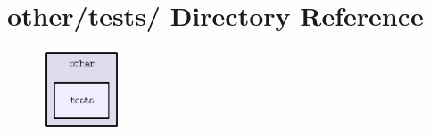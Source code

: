 \section{other/tests/ Directory Reference}
\label{dir_8c1084bcbda9c67416fd75418d7fa57f}


\begin{figure}[H]
\begin{center}
\leavevmode
\includegraphics[width=65pt]{dir_8c1084bcbda9c67416fd75418d7fa57f_dep}
\end{center}
\end{figure}
